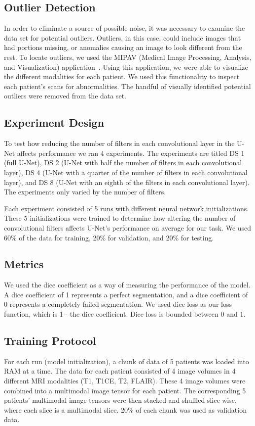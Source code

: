 \documentclass[conference]{IEEEtran}
\begin{document}
\subsection{Outlier Detection}
In order to eliminate a source of possible noise, it was necessary to examine the data set for potential outliers. Outliers, in this case, could include images that had portions missing, or anomalies causing an image to look different from the rest. To locate outliers, we used the MIPAV (Medical Image Processing, Analysis, and Visualization) application~\cite{mcauliffe2009medical}. Using this application, we were able to visualize the different modalities for each patient. We used this functionality to inspect each patient’s scans for abnormalities. The handful of visually identified potential outliers were removed from the data set.


\subsection{Experiment Design}
To test how reducing the number of filters in each convolutional layer in the U-Net affects performance we ran 4 experiments. The experiments are titled DS 1 (full U-Net), DS 2 (U-Net with half the number of filters in each convolutional layer), DS 4 (U-Net with a quarter of the number of filters in each convolutional layer), and DS 8 (U-Net with an eighth of the filters in each convolutional layer). The experiments only varied by the number of filters.

Each experiment consisted of 5 runs with different neural network initializations. These 5 initializations were trained to determine how altering the number of convolutional filters affects U-Net's performance on average for our task. We used 60\% of the data for training, 20\% for validation, and 20\% for testing.

\subsection{Metrics}
We used the dice coefficient as a way of measuring the performance of the model. A dice coefficient of 1 represents a perfect segmentation, and a dice coefficient of 0 represents a completely failed segmentation. We used dice loss as our loss function, which is 1 - the dice coefficient. Dice loss is bounded between 0 and 1.

\subsection{Training Protocol}
For each run (model initialization), a chunk of data of 5 patients was loaded into RAM at a time. The data for each patient consisted of 4 image volumes in 4 different MRI modalities (T1, T1CE, T2, FLAIR). These 4 image volumes were combined into a multimodal image tensor for each patient. The corresponding 5 patients’ multimodal image tensors were then stacked and shuffled slice-wise, where each slice is a multimodal slice. 20\% of each chunk was used as validation data. 
\end{document}
